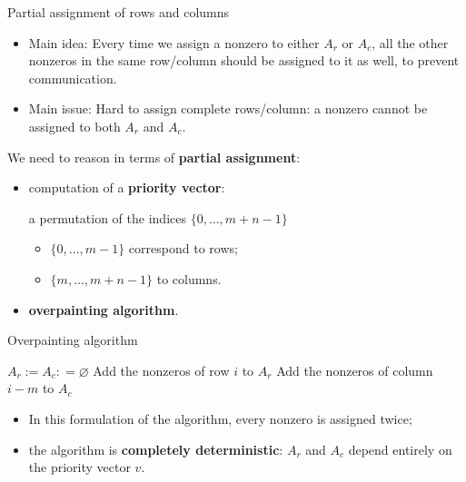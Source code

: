 \begin{frame}{Partial assignment of rows and columns}

\begin{itemize}
		\item	Main idea: Every time we assign a nonzero to either $A_r$ or $A_c$, all the other nonzeros in the same row/column should be assigned to it as well, to prevent communication.
		\item	Main issue: Hard to assign complete rows/column: a nonzero cannot be assigned to both $A_r$ and $A_c$.
\end{itemize}

We need to reason in terms of \textbf{partial assignment}:

	\begin{itemize}
		\item	computation of a \textbf{priority vector}:
			
			a permutation of the indices $\{0,\dots,m+n-1\}$ 
			\begin{itemize}
				\item  $\{0,\dots,m-1\}$ correspond to rows;
				\item  $\{m,\dots,m+n-1\}$ to columns.
			\end{itemize}
		\item \textbf{overpainting algorithm}.
	\end{itemize}
\end{frame}


\begin{frame}{Overpainting algorithm}
\begin{algorithm}[H]
	\begin{algorithmic}
		\State $A_r := A_c: = \varnothing$
	\State Add the nonzeros of row $i$ to $A_r$
	\Else
	\State Add the nonzeros of column $i-m$ to $A_c$
	\EndIf
	\EndFor
\end{algorithmic}
\end{algorithm}

\vspace{-0.4cm}

\begin{itemize}
	\item In this formulation of the algorithm, every nonzero is assigned twice;
	\item the algorithm is \textbf{completely deterministic}: $A_r$ and $A_c$ depend entirely on the priority vector $v$.
\end{itemize}

\end{frame}

